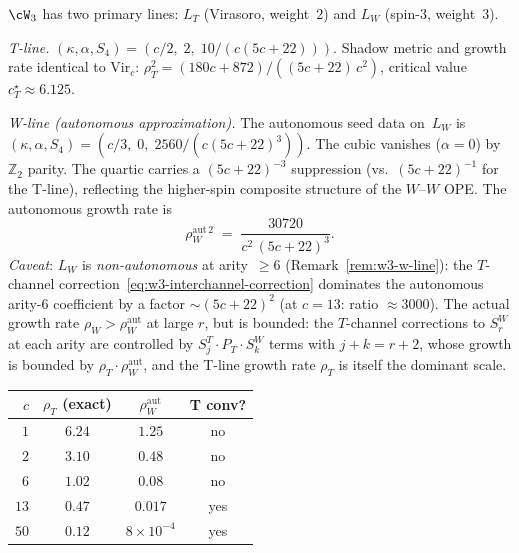 \begin{example}
\label{ex:w3-two-line-shadow}
$\cW_3$ has two primary lines:
$L_T$ (Virasoro, weight~$2$) and $L_W$ (spin-$3$, weight~$3$).

\smallskip\noindent\emph{T-line.}\enspace
$(\kappa, \alpha, S_4) =
(c/2,\; 2,\; 10/(c(5c{+}22)))$.
Shadow metric and growth rate identical to
$\mathrm{Vir}_c$:
$\rho_T^2 = (180c{+}872)/((5c{+}22)\,c^2)$,
critical value $c_T^\star \approx 6.125$.

\smallskip\noindent\emph{W-line \textup{(}autonomous approximation\textup{)}.}\enspace
The autonomous seed data on~$L_W$ is
$(\kappa, \alpha, S_4) =
(c/3,\; 0,\; 2560/(c(5c{+}22)^3))$.
The cubic vanishes ($\alpha = 0$) by $\mathbb{Z}_2$
parity.  The quartic carries a
$(5c{+}22)^{-3}$ suppression (vs.~$(5c{+}22)^{-1}$
for the T-line), reflecting the higher-spin composite
structure of the $W$--$W$ OPE.
The autonomous growth rate is
\begin{equation}\label{eq:w3-wline-rho}
  \rho_W^{\mathrm{aut}\,2}
  \;=\;
  \frac{30720}{c^2\,(5c{+}22)^3}.
\end{equation}
\emph{Caveat}: $L_W$ is \emph{non-autonomous} at
arity~$\geq 6$
\textup{(}Remark~\textup{\ref{rem:w3-w-line}}):
the $T$-channel correction~\eqref{eq:w3-interchannel-correction}
dominates the autonomous arity-$6$ coefficient by a
factor $\sim (5c{+}22)^2$
(at $c = 13$: ratio $\approx 3000$).
The actual growth rate $\rho_W > \rho_W^{\mathrm{aut}}$
at large $r$, but is bounded:
the $T$-channel corrections to
$S_r^W$ at each arity are controlled by
$S_j^T \cdot P_T \cdot S_k^W$ terms with
$j + k = r + 2$, whose growth is bounded by
$\rho_T \cdot \rho_W^{\mathrm{aut}}$,
and the T-line growth rate $\rho_T$ is itself
the dominant scale.
\begin{center}
\renewcommand{\arraystretch}{1.2}
\begin{tabular}{rccc}
\toprule
$c$ & $\rho_T$ \textup{(exact)} &
  $\rho_W^{\mathrm{aut}}$
  & T conv? \\
\midrule
$1$ & $6.24$ & $1.25$ & no \\
$2$ & $3.10$ & $0.48$ & no \\
$6$ & $1.02$ & $0.08$ & no \\
$13$ & $0.47$ & $0.017$ & yes \\
$50$ & $0.12$ & $8 \times 10^{-4}$ & yes \\
\bottomrule
\end{tabular}
\end{center}


\end{example}
